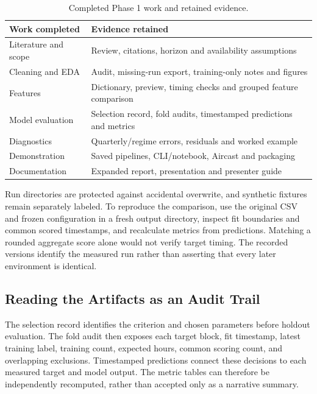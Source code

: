 \documentclass[conference]{IEEEtran}
\begin{document}
\begin{table}[ht]
\centering
\caption{Completed Phase 1 work and retained evidence.}
\label{tab:completion}
\begin{tabular}{>{\raggedright\arraybackslash}p{}>{\raggedright\arraybackslash}p{}}
\toprule
Work completed & Evidence retained\\\midrule
Literature and scope & Review, citations, horizon and availability assumptions\\
Cleaning and EDA & Audit, missing-run export, training-only notes and figures\\
Features & Dictionary, preview, timing checks and grouped feature comparison\\
Model evaluation & Selection record, fold audits, timestamped predictions and metrics\\
Diagnostics & Quarterly/regime errors, residuals and worked example\\
Demonstration & Saved pipelines, CLI/notebook, Aircast and packaging\\
Documentation & Expanded report, presentation and presenter guide\\\bottomrule
\end{tabular}
\end{table}

Run directories are protected against accidental overwrite, and synthetic fixtures remain separately labeled. To reproduce the comparison, use the original CSV and frozen configuration in a fresh output directory, inspect fit boundaries and common scored timestamps, and recalculate metrics from predictions. Matching a rounded aggregate score alone would not verify target timing. The recorded versions identify the measured run rather than asserting that every later environment is identical.

\subsection{Reading the Artifacts as an Audit Trail}
The selection record identifies the criterion and chosen parameters before holdout evaluation. The fold audit then exposes each target block, fit timestamp, latest training label, training count, expected hours, common scoring count, and overlapping exclusions. Timestamped predictions connect these decisions to each measured target and model output. The metric tables can therefore be independently recomputed, rather than accepted only as a narrative summary.
\end{document}
